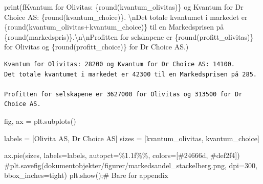 \documentclass[
  12pt,
  a4paper,
  DIV=11,
  numbers=noendperiod]{scrartcl}
\newenvironment{Shaded}{\begin{snugshade}}{\end{snugshade}}
\newcommand{\BuiltInTok}[1]{\textcolor[rgb]{0.00,0.23,0.31}{#1}}
\newcommand{\CharTok}[1]{\textcolor[rgb]{0.13,0.47,0.30}{#1}}
\newcommand{\CommentTok}[1]{\textcolor[rgb]{0.37,0.37,0.37}{#1}}
\newcommand{\NormalTok}[1]{\textcolor[rgb]{0.00,0.23,0.31}{#1}}
\newcommand{\OperatorTok}[1]{\textcolor[rgb]{0.37,0.37,0.37}{#1}}
\newcommand{\SpecialCharTok}[1]{\textcolor[rgb]{0.37,0.37,0.37}{#1}}
\newcommand{\SpecialStringTok}[1]{\textcolor[rgb]{0.13,0.47,0.30}{#1}}
\newcommand{\StringTok}[1]{\textcolor[rgb]{0.13,0.47,0.30}{#1}}
\begin{document}
\begin{Shaded}
\begin{Highlighting}[]
\BuiltInTok{print}\NormalTok{(}\SpecialStringTok{f\textquotesingle{}\textquotesingle{}\textquotesingle{}Kvantum for Olivitas: }\SpecialCharTok{\{}\BuiltInTok{round}\NormalTok{(kvantum\_olivitas)}\SpecialCharTok{\}}\SpecialStringTok{ og Kvantum for Dr Choice AS: }\SpecialCharTok{\{}\BuiltInTok{round}\NormalTok{(kvantum\_choice)}\SpecialCharTok{\}}\SpecialStringTok{. }\CharTok{\textbackslash{}n}\SpecialStringTok{Det totale kvantumet i markedet er }\SpecialCharTok{\{}\BuiltInTok{round}\NormalTok{(kvantum\_olivitas}\OperatorTok{+}\NormalTok{kvantum\_choice)}\SpecialCharTok{\}}\SpecialStringTok{ til en Markedsprisen på }\SpecialCharTok{\{}\BuiltInTok{round}\NormalTok{(markedspris)}\SpecialCharTok{\}}\SpecialStringTok{.}\CharTok{\textbackslash{}n\textbackslash{}n}\SpecialStringTok{Profitten for selskapene er }\SpecialCharTok{\{}\BuiltInTok{round}\NormalTok{(profitt\_olivitas)}\SpecialCharTok{\}}\SpecialStringTok{ for Olivitas og }\SpecialCharTok{\{}\BuiltInTok{round}\NormalTok{(profitt\_choice)}\SpecialCharTok{\}}\SpecialStringTok{ for Dr Choice AS.\textquotesingle{}\textquotesingle{}\textquotesingle{}}\NormalTok{)}
\end{Highlighting}
\end{Shaded}

\begin{verbatim}
Kvantum for Olivitas: 28200 og Kvantum for Dr Choice AS: 14100. 
Det totale kvantumet i markedet er 42300 til en Markedsprisen på 285.

Profitten for selskapene er 3627000 for Olivitas og 313500 for Dr Choice AS.
\end{verbatim}

\begin{Shaded}
\begin{Highlighting}[]
\NormalTok{fig, ax }\OperatorTok{=}\NormalTok{ plt.subplots()}

\NormalTok{labels }\OperatorTok{=}\NormalTok{ [}\StringTok{\textquotesingle{}Olivita AS\textquotesingle{}}\NormalTok{, }\StringTok{\textquotesingle{}Dr Choice AS\textquotesingle{}}\NormalTok{]}
\NormalTok{sizes }\OperatorTok{=}\NormalTok{ [kvantum\_olivitas, kvantum\_choice]}

\NormalTok{ax.pie(sizes, labels}\OperatorTok{=}\NormalTok{labels, autopct}\OperatorTok{=}\StringTok{\textquotesingle{}}\SpecialCharTok{\%1.1f\%\%}\StringTok{\textquotesingle{}}\NormalTok{, colors}\OperatorTok{=}\NormalTok{[}\StringTok{\textquotesingle{}\#24666d\textquotesingle{}}\NormalTok{, }\StringTok{\textquotesingle{}\#def2f4\textquotesingle{}}\NormalTok{])}
\CommentTok{\#plt.savefig(\textquotesingle{}dokumentobjekter/figurer/markedsandel\_stackelberg.png\textquotesingle{}, dpi=300, bbox\_inches=\textquotesingle{}tight\textquotesingle{})}
\NormalTok{plt.show()}\OperatorTok{;}\CommentTok{\# Bare for appendix}
\end{Highlighting}
\end{Shaded}
\end{document}
